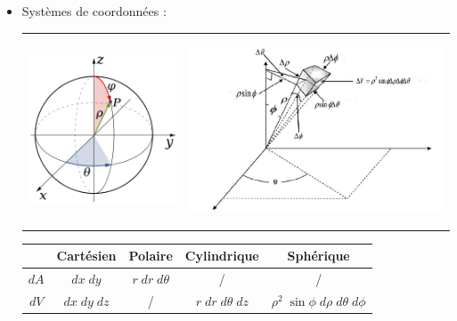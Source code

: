\documentclass[a4paper]{article}
\begin{document}
\begin{itemize}
\item Systèmes de coordonnées : \\
\begin{center} \begin{tabular}{M{6cm}M{10cm}}
\begin{center}
\includegraphics[width=5.5cm]{images/sphere.png}
\end{center}
&
\begin{center}
\includegraphics[width=9.5cm]{images/sphere2.png}
\end{center}
\end{tabular} \end{center}

\begin{center}
    \begin{tabular}{|c|cccc|} \hline
        & Cartésien & Polaire & Cylindrique & Sphérique \\ \hline
        $dA$ & $ dx \; dy $       & $ r \; dr \; d \theta $ & / & / \\
        $dV$ & $ dx \; dy \; dz $ & / & $ r \; dr \; d \theta \; dz $ & $ \rho^2 \; \sin \phi \; d \rho \; d \theta \; d \phi $ \\ \hline
    \end{tabular}
\end{center}


\end{itemize}
\end{document}
